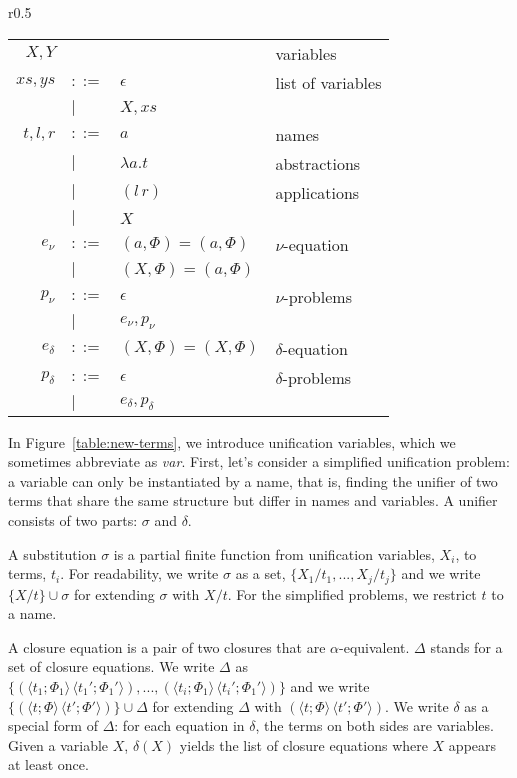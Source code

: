 \documentclass[a4paper,UKenglish]{lipics-v2016}
\newcommand{\clos}[2] {
  \langle #1; #2 \rangle
}
\newcommand{\app}[2] {
  (#1\, #2)
}
\newcommand{\pr}[2] {
 (#1\, #2)
}
\newcommand{\bd}[2] {
 #1/ #2
}
\begin{document}
\label{unify}
\begin{wrapfigure}{r}{0.5\textwidth}
  \caption{Unification terms and problems\label{table:new-terms}}
    \begin{tabular}{r l l l}  
    $X,Y$   &       &     & variables \\
      $xs,ys$ & $::=$ & $\epsilon$& list of variables \\
      & $|$&  $X,xs$ &  \\
    $t,l,r$ & $::=$ & $a$ & names \\
    & $|$ & $\lambda a.t$ & abstractions \\
    & $|$ & $\app{l}{r}$ & applications \\
      & $|$ & $X$ & \\
      $e_\nu$  & $::=$ & $(a,\Phi) = (a,\Phi)$ & $\nu$-equation \\
           & $|$ &  $(X,\Phi) = (a,\Phi)$ \\
      $p_\nu$  & $::=$ & $\epsilon$ & $\nu$-problems \\
           & $|$ & $e_\nu, p_\nu$ \\
      $e_\delta$  & $::=$& $(X,\Phi) = (X,\Phi)$ & $\delta$-equation \\
      $p_\delta$  & $::=$ & $\epsilon$ & $\delta$-problems \\
           & $|$ & $e_\delta, p_\delta$
    \end{tabular}
\end{wrapfigure}

In Figure~\ref{table:new-terms}, we introduce unification variables,
which we sometimes abbreviate as \emph{var}.  First, let's consider a simplified unification
problem: a variable can only be instantiated by a name, that is,
finding the unifier of two terms that share the same structure but
differ in names and variables.  A unifier consists of two parts:
$\sigma$ and $\delta$.
\begin{definition}
  A substitution $\sigma$ is a partial finite function from unification variables,
  $X_i$, to terms, $t_i$.  For readability, we write $\sigma$ as a
  set, $\{\bd{X_1}{t_1}, ..., \bd{X_j}{t_j}\}$ and we write
  $\{\bd{X}{t}\} \cup \sigma$ for extending $\sigma$ with $\bd{X}{t}$.
  For the simplified problems, we restrict $t$ to a name.
\end{definition}

\begin{definition}
  A closure equation is a pair of two closures that are
  $\alpha$-equivalent.  $\Delta$ stands for a set of closure equations.  We
  write $\Delta$ as $\{\pr{\clos{t_1}{\Phi_1}}{\clos{t_1'}{\Phi_1'}},
  ..., \pr{\clos{t_i}{\Phi_1}}{\clos{t_i'}{\Phi_1'}}\}$ and we write
  $\{\pr{\clos{t}{\Phi}}{\clos{t'}{\Phi'}}\}\cup\Delta$ for extending
  $\Delta$ with $\pr{\clos{t}{\Phi}}{\clos{t'}{\Phi'}}$.  We write
  $\delta$ as a special form of $\Delta$: for each equation in
  $\delta$, the terms on both sides are variables.
  {\color{red}}
  Given a variable
  $X$, $\delta(X)$ yields the list of
  closure equations where $X$ appears at least once.
\end{definition}
\end{document}
